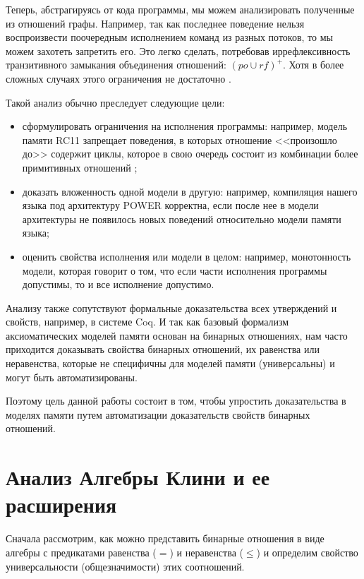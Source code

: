 \documentclass[times
              ,specification
              ,annotation
              ]{itmo-student-thesis}
\begin{document}
  Теперь, абстрагируясь от кода программы, мы можем анализировать полученные из отношений
  графы. Например, так как последнее поведение нельзя воспроизвести поочередным исполнением команд из
  разных потоков, то мы можем захотеть запретить его.
  Это легко сделать, потребовав иррефлексивность транзитивного замыкания
  объединения отношений: $ (\textit{po} \cup \textit{rf})^+ $.
  Хотя в более сложных случаях этого ограничения не достаточно \cite{rc11}.

  Такой анализ обычно преследует следующие цели:
  \begin{itemize}
    \item сформулировать ограничения на исполнения программы:
    например, модель памяти RC11 запрещает поведения, в которых отношение <<произошло до>> содержит
    циклы, которое в свою очередь состоит из комбинации более примитивных отношений \cite{rc11};
    \item доказать вложенность одной модели в другую:
    например, компиляция нашего языка под архитектуру POWER корректна, если после нее в модели
    архитектуры \cite{axiomatic_memory_model_for_power_mp} не появилось новых поведений относительно
    модели памяти языка;
    \item оценить свойства исполнения или модели в целом:
    например, монотонность модели, которая говорит о том, что если части исполнения программы
    допустимы, то и все исполнение допустимо.
  \end{itemize}

  Анализу также сопутствуют формальные доказательства всех утверждений и свойств, например, в системе Coq.
  И так как базовый формализм аксиоматических моделей памяти основан на бинарных отношениях, нам часто
  приходится доказывать свойства бинарных отношений, их равенства или неравенства, которые не
  специфичны для моделей памяти (универсальны) и могут быть автоматизированы.

  Поэтому цель данной работы состоит в том, чтобы упростить доказательства в моделях памяти путем
  автоматизации доказательств свойств бинарных отношений.

  \section{Анализ Алгебры Клини и ее расширения}

    Сначала рассмотрим, как можно представить бинарные отношения в виде алгебры с предикатами равенства
    ($ = $) и неравенства ($ \leq $) и определим свойство универсальности (общезначимости) этих
    соотношений.
\end{document}
